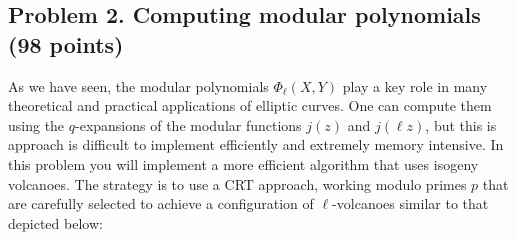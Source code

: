 \documentclass[11pt]{article}
\theoremstyle{definition}
\begin{document}
\subsection*{Problem 2. Computing modular polynomials (98 points)}
As we have seen, the modular polynomials $\Phi_\ell(X,Y)$ play a key role in many theoretical and practical applications of elliptic curves.
One can compute them using the $q$-expansions of the modular functions $j(z)$ and $j(\ell z)$, but this is approach is difficult to implement efficiently and extremely memory intensive.
In this problem you will implement a more efficient algorithm that uses isogeny volcanoes.
The strategy is to use a CRT approach, working modulo primes $p$ that are carefully selected to achieve a configuration of $\ell$-volcanoes similar to that depicted below:

\vspace{6pt}
\end{document}
